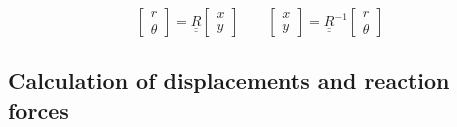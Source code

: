 \documentclass[a4paper]{jpconf}
\begin{document}
\begin{equation}
\begin{bmatrix}
r \\
\theta
\end{bmatrix}=\underline{\underline{R}}\begin{bmatrix}
x \\
y
\end{bmatrix}\qquad\begin{bmatrix}
x \\
y
\end{bmatrix}=\underline{\underline{R}}^{-1}\begin{bmatrix}
r \\
\theta
\end{bmatrix}
\end{equation}

\subsection{Calculation of displacements and reaction forces}
\end{document}
